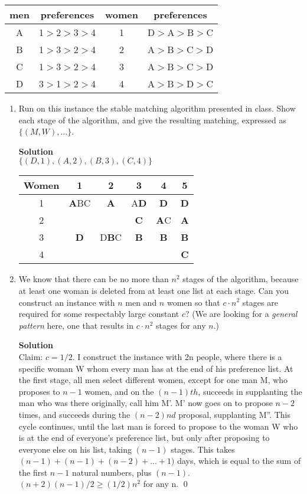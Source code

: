 \documentclass[11pt]{article}
\newenvironment{Parts}{\begin{enumerate}[label=(\alph*)]}{\end{enumerate}}
\newcommand*{\Part}{\item}
\begin{document}
\begin{center}
\begin{tabular}{|c|c||c|c|}\hline
men&preferences&women & preferences \\
\hline
A& 1$>$2$>$3$>$4&1& D$>$A$>$B$>$C \\
\hline
B&1$>$3$>$2$>$4 &2& A$>$B$>$C$>$D  \\
\hline
C&1$>$3$>$2$>$4 &3& A$>$B$>$C$>$D  \\
\hline
D&3$>$1$>$2$>$4 &4& A$>$B$>$D$>$C  \\
\hline
\end{tabular}
\end{center}

\begin{Parts}
\Part  Run on this instance the stable matching algorithm presented in class. Show each stage of the algorithm, and give the resulting matching, expressed as $\{(M,W),\ldots\}$.

\begin{mdframed} \textbf{Solution} \\ 
$\{ (D,1), (A,2), (B,3), (C,4) \}$ \\
\begin{tabular}{|c|c|c|c|c|c|}\hline
Women&1&2&3&4&5 \\
\hline
1& \textbf{A}BC & \textbf{A} & A\textbf{D} & \textbf{D} & \textbf{D} \\
\hline
2& & & \textbf{C} & \textbf{A}C & \textbf{A}  \\
\hline
3& \textbf{D} & D\textbf{B}C & \textbf{B} & \textbf{B} & \textbf{B}  \\
\hline
4&  & & & & \textbf{C}  \\ 
\hline
\end{tabular}
\end{mdframed}

\Part  We know that there can be no more than $n^2$ stages of the algorithm, because at least one woman is deleted from at least one list at each stage.  Can you construct an instance with $n$ men and $n$ women so that $c\cdot n^2$ stages are required for some respectably large constant $c$? (We are looking for a {\em general pattern} here, one that results in $c\cdot n^2$ stages for any $n$.)

\begin{mdframed} \textbf{Solution} \\
Claim: $c = 1/2$. I construct the instance with 2n people, where there is a specific woman W whom every man has at the end of his preference list. At the first stage, all men select different women, except for one man M, who proposes to $n-1$ women, and on the $(n-1)th$, succeeds in supplanting the man who was there originally, call him M'. M' now goes on to propose $n-2$ times, and succeeds during the $(n-2)nd$ proposal, supplanting M''. This cycle continues, until the last man is forced to propose to the woman W who is at the end of everyone's preference list, but only after proposing to everyone else on his list, taking $(n-1)$ stages. This takes $(n - 1) + (n - 1) + (n - 2) + ... + 1)$ days, which is equal to the sum of the first $n - 1$ natural numbers, plus $(n - 1)$. $(n + 2)(n-1)/2 \geq (1/2)n^2$ for any n. \qed
\end{mdframed}


\end{Parts}
\end{document}

